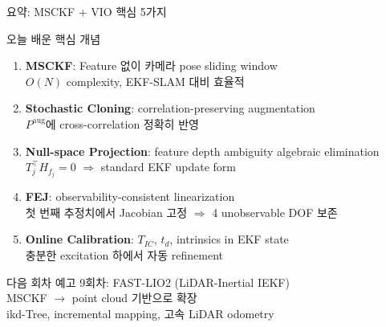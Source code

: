 \begin{frame}[shrink=10]{요약: MSCKF + VIO 핵심 5가지}
  \begin{block}{오늘 배운 핵심 개념}
    \begin{enumerate}
      \item \textbf{MSCKF}: Feature 없이 카메라 pose sliding window\\
        $O(N)$ complexity, EKF-SLAM 대비 효율적
      \item \textbf{Stochastic Cloning}: correlation-preserving augmentation\\
        $P^{\text{aug}}$에 cross-correlation 정확히 반영
      \item \textbf{Null-space Projection}: feature depth ambiguity algebraic elimination\\
        $T_j^\top H_{f_j} = 0$ $\Rightarrow$ standard EKF update form
      \item \textbf{FEJ}: observability-consistent linearization\\
        첫 번째 추정치에서 Jacobian 고정 $\Rightarrow$ 4 unobservable DOF 보존
      \item \textbf{Online Calibration}: $T_{IC}$, $t_d$, intrinsics in EKF state\\
        충분한 excitation 하에서 자동 refinement
    \end{enumerate}
  \end{block}
  \begin{exampleblock}{다음 회차 예고}
    9회차: FAST-LIO2 (LiDAR-Inertial IEKF)\\
    MSCKF $\to$ point cloud 기반으로 확장\\
    ikd-Tree, incremental mapping, 고속 LiDAR odometry
  \end{exampleblock}
\end{frame}



